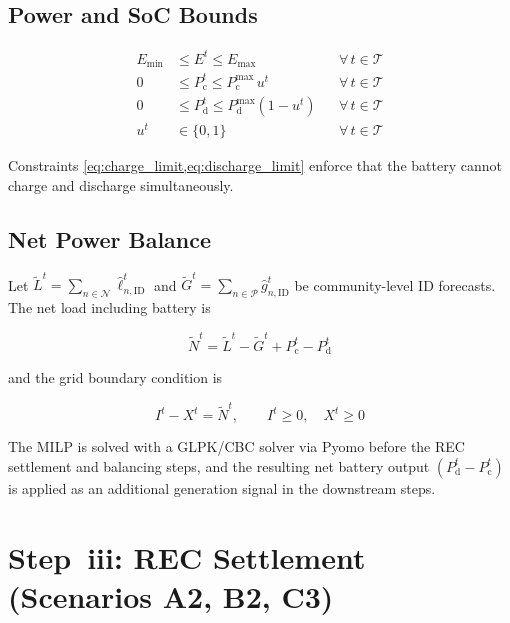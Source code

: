 \documentclass[12pt,a4paper]{article}
\begin{document}
\subsection{Power and SoC Bounds}

\begin{align}
E_{\min} &\leq E^{t} \leq E_{\max}
  &&\forall\, t \in \mathcal{T} \label{eq:soc_bounds}\\
0 &\leq P_{\mathrm{c}}^{t} \leq P_{\mathrm{c}}^{\max}\,u^{t}
  &&\forall\, t \in \mathcal{T} \label{eq:charge_limit}\\
0 &\leq P_{\mathrm{d}}^{t} \leq P_{\mathrm{d}}^{\max}(1 - u^{t})
  &&\forall\, t \in \mathcal{T} \label{eq:discharge_limit}\\
u^{t} &\in \{0,1\}
  &&\forall\, t \in \mathcal{T} \label{eq:binary}
\end{align}

Constraints \cref{eq:charge_limit,eq:discharge_limit} enforce that the battery
cannot charge and discharge simultaneously.

\subsection{Net Power Balance}

Let $\tilde{L}^{t} = \sum_{n \in \mathcal{N}} \hat{\ell}_{n,\mathrm{ID}}^{t}$
and $\tilde{G}^{t} = \sum_{n \in \mathcal{P}} \hat{g}_{n,\mathrm{ID}}^{t}$
be community-level ID forecasts.  The net load including battery is

\begin{equation}
\tilde{N}^{t} = \tilde{L}^{t} - \tilde{G}^{t}
         + P_{\mathrm{c}}^{t} - P_{\mathrm{d}}^{t}
\label{eq:net_with_battery}
\end{equation}

and the grid boundary condition is

\begin{equation}
I^{t} - X^{t} = \tilde{N}^{t}, \qquad I^{t} \geq 0,\quad X^{t} \geq 0
\label{eq:grid_balance}
\end{equation}

\noindent
The MILP is solved with a GLPK/CBC solver via Pyomo before the REC settlement
and balancing steps, and the resulting net battery output
$(P_{\mathrm{d}}^{t} - P_{\mathrm{c}}^{t})$ is applied as an additional
generation signal in the downstream steps.

\section{Step~iii: REC Settlement (Scenarios A2, B2, C3)}
\end{document}
